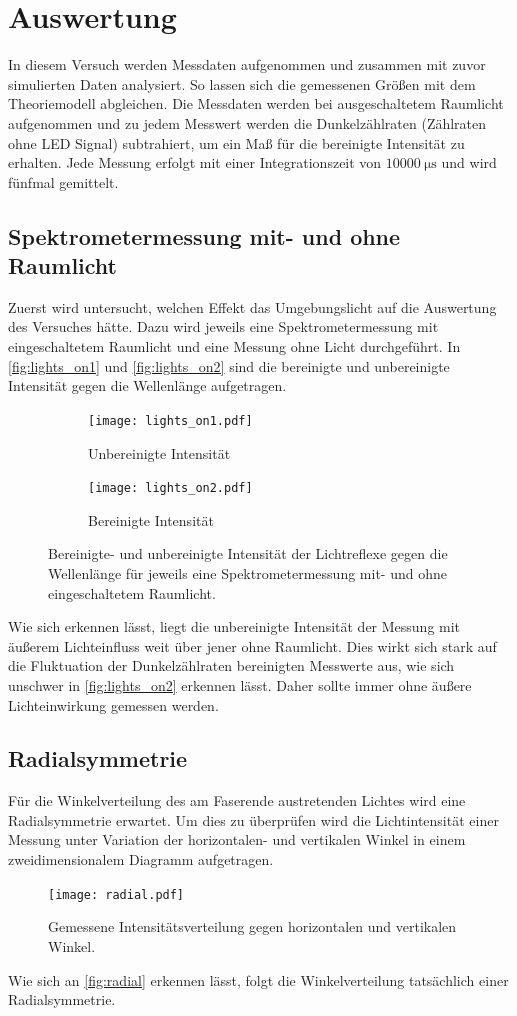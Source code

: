 \section{Auswertung}
\label{sec:Auswertung}
In diesem Versuch werden Messdaten aufgenommen und zusammen mit zuvor simulierten Daten analysiert. So lassen sich die gemessenen Größen mit dem Theoriemodell abgleichen.
Die Messdaten werden bei ausgeschaltetem Raumlicht aufgenommen und zu jedem Messwert werden die Dunkelzählraten (Zählraten ohne LED Signal) subtrahiert, um 
ein Maß für die bereinigte Intensität zu erhalten. Jede Messung erfolgt mit einer Integrationszeit von $\qty{10000}{\micro\second}$ und wird fünfmal gemittelt.

\subsection{Spektrometermessung mit- und ohne Raumlicht}
\label{sec:Spektrometermessung}
Zuerst wird untersucht, welchen Effekt das Umgebungslicht auf die Auswertung des Versuches hätte. Dazu wird jeweils eine Spektrometermessung mit eingeschaltetem Raumlicht 
und eine Messung ohne Licht durchgeführt. In \autoref{fig:lights_on1} und \autoref{fig:lights_on2} sind die bereinigte und unbereinigte Intensität gegen die Wellenlänge aufgetragen.
\begin{figure}
  \centering
  \begin{subfigure}{0.7\textwidth}
    \texttt{[image: lights\_on1.pdf]}
    \caption{Unbereinigte Intensität}
    \label{fig:lights_on1}
  \end{subfigure}
  \hfill
  \begin{subfigure}{0.7\textwidth}
    \texttt{[image: lights\_on2.pdf]}
    \caption{Bereinigte Intensität}
    \label{fig:lights_on2}
  \end{subfigure}
  \caption{Bereinigte- und unbereinigte Intensität der Lichtreflexe gegen die Wellenlänge für jeweils eine Spektrometermessung mit- und ohne eingeschaltetem Raumlicht.}
  \label{fig:lights_on}
\end{figure}
Wie sich erkennen lässt, liegt die unbereinigte Intensität der Messung mit äußerem Lichteinfluss weit über jener ohne Raumlicht. Dies wirkt sich stark auf die Fluktuation 
der Dunkelzählraten bereinigten Messwerte aus, wie sich unschwer in \autoref{fig:lights_on2} erkennen lässt. Daher sollte immer ohne äußere Lichteinwirkung gemessen werden.

\subsection{Radialsymmetrie}
Für die Winkelverteilung des am Faserende austretenden Lichtes wird eine Radialsymmetrie erwartet. Um dies zu überprüfen wird die Lichtintensität einer Messung unter Variation
der horizontalen- und vertikalen Winkel in einem zweidimensionalem Diagramm aufgetragen.
\begin{figure}
  \centering
  \texttt{[image: radial.pdf]}
  \caption{Gemessene Intensitätsverteilung gegen horizontalen und vertikalen Winkel.}
  \label{fig:radial}
\end{figure}
Wie sich an \autoref{fig:radial} erkennen lässt, folgt die Winkelverteilung tatsächlich einer Radialsymmetrie.

